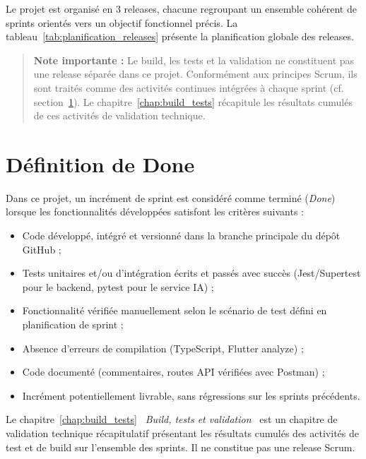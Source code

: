 Le projet est organisé en 3 releases, chacune regroupant un ensemble cohérent de sprints orientés vers un objectif fonctionnel précis. La tableau~\ref{tab:planification_releases} présente la planification globale des releases.



\begin{quote}
\textbf{Note importante :} Le build, les tests et la validation ne constituent pas une release séparée dans ce projet. Conformément aux principes Scrum, ils sont traités comme des activités continues intégrées à chaque sprint (cf. section~\ref{sec:definition_done}). Le chapitre~\ref{chap:build_tests} récapitule les résultats cumulés de ces activités de validation technique.
\end{quote}

\section{Définition de Done}
\label{sec:definition_done}

Dans ce projet, un incrément de sprint est considéré comme terminé (\textit{Done}) lorsque les fonctionnalités développées satisfont les critères suivants :

\begin{itemize}
  \item Code développé, intégré et versionné dans la branche principale du dépôt GitHub ;
  \item Tests unitaires et/ou d'intégration écrits et passés avec succès (Jest/Supertest pour le backend, pytest pour le service IA) ;
  \item Fonctionnalité vérifiée manuellement selon le scénario de test défini en planification de sprint ;
  \item Absence d'erreurs de compilation (TypeScript, Flutter analyze) ;
  \item Code documenté (commentaires, routes API vérifiées avec Postman) ;
  \item Incrément potentiellement livrable, sans régressions sur les sprints précédents.
\end{itemize}

Le chapitre~\ref{chap:build_tests} \textit{\og~Build, tests et validation~\fg{}} est un chapitre de validation technique récapitulatif présentant les résultats cumulés des activités de test et de build sur l'ensemble des sprints. Il ne constitue pas une release Scrum.

